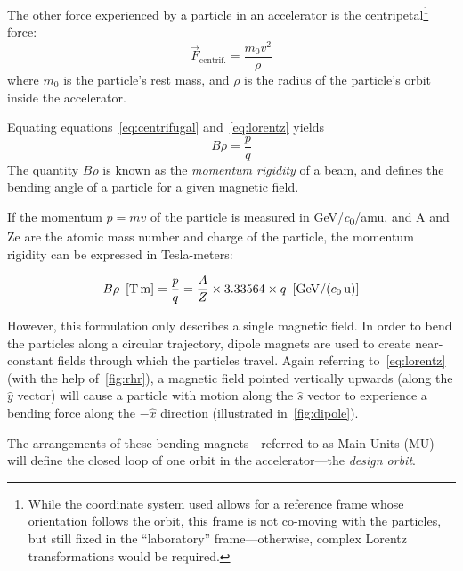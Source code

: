 \documentclass[11pt]{report}
\begin{document}
The other force experienced by a particle in an accelerator is the centripetal\footnote{While the coordinate system used allows for a reference frame whose orientation follows the orbit, this frame is not co-moving with the particles, but still fixed in the ``laboratory'' frame---otherwise, complex Lorentz transformations would be required.} force:
\begin{equation}
\vec F_{\text{centrif.}}=\frac{m_0v^2}{\rho}\label{eq:centrifugal}
\end{equation} where $m_0$ is the particle's rest mass, and $\rho$ is the radius of the particle's orbit inside the accelerator.

Equating equations~\ref{eq:centrifugal} and~\ref{eq:lorentz} yields
\begin{equation}
B\rho=\frac pq
\label{eq:brho}
\end{equation}
The quantity $B\rho$ is known as the \textit{momentum rigidity} of a beam, and defines the bending angle of a particle for a given magnetic field. 

If the momentum $p=mv$ of the particle is measured in \unit[per-mode = symbol]{\GeV\per\clight\per amu}, and A and Ze are the atomic mass number and charge of the particle, the momentum rigidity can be expressed in Tesla-meters:

\begin{equation}
B\rho\ \left[\unit{\tesla\meter}\right]=\frac pq=\frac AZ\times3.33564\times q\ \left[\unit[per-mode=symbol]{\GeV\per\clight\per\atomicmassunit}\right]
\end{equation}

However, this formulation only describes a single magnetic field. In order to bend the particles along a circular trajectory, dipole magnets are used to create near-constant fields through which the particles travel. Again referring to~\autoref{eq:lorentz} (with the help of~\autoref{fig:rhr}), a magnetic field pointed vertically upwards (along the $\hat y$ vector) will cause a particle with motion along the $\hat s$ vector to experience a bending force along the $-\hat x$ direction (illustrated in~\autoref{fig:dipole}).

The arrangements of these bending magnets---referred to as Main Units (MU)---will define the closed loop of one orbit in the accelerator---the {\it design orbit}.
\end{document}
